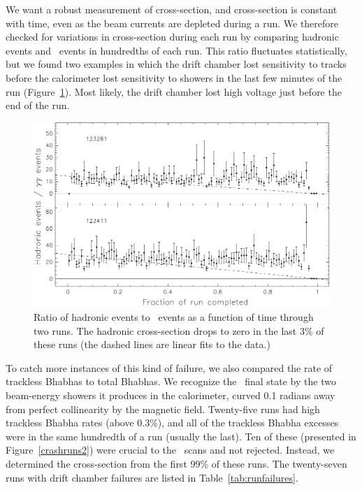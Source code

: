 \documentclass{cornell}
\begin{document}
We want a robust measurement of cross-section, and cross-section is
constant with time, even as the beam currents are depleted during a
run.  We therefore checked for variations in cross-section during each
run by comparing hadronic events and \gamgam\ events in hundredths of
each run.  This ratio fluctuates statistically, but we found two
examples in which the drift chamber lost sensitivity to tracks before
the calorimeter lost sensitivity to showers in the last few minutes of
the run (Figure~\ref{crashruns}).  Most likely, the drift chamber lost
high voltage just before the end of the run.

\begin{figure}[p]
  \begin{center}
    \includegraphics[width=\linewidth]{plots/crashruns}
  \end{center}
  \caption{\label{crashruns} Ratio of hadronic events to \gamgam\
  events as a function of time through two runs.  The hadronic
  cross-section drops to zero in the last 3\% of these runs (the
  dashed lines are linear fits to the data.)}
\end{figure}

To catch more instances of this kind of failure, we also compared the
rate of trackless Bhabhas to total Bhabhas.  We recognize the \ee\
final state by the two beam-energy showers it produces in the
calorimeter, curved 0.1 radians away from perfect collinearity by the
magnetic field.  Twenty-five runs had high trackless Bhabha rates
(above 0.3\%), and all of the trackless Bhabha excesses were in the
same hundredth of a run (usually the last).  Ten of these (presented
in Figure~\ref{crashruns2}) were crucial to the \ups\ scans and not
rejected.  Instead, we determined the cross-section from the
first 99\% of these runs.  The twenty-seven runs with drift chamber
failures are listed in Table~\ref{tab:runfailures}.
\end{document}
